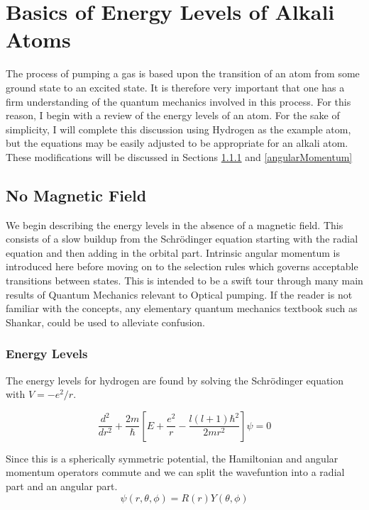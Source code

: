 \documentclass[letter,12pt]{article}
\newcommand{\schr}{Schr\"odinger}
\begin{document}
\section{Basics of Energy Levels of Alkali Atoms}
The process of pumping a gas is based upon the transition
of an atom from some ground state to an excited state. 
It is therefore very important that one has a firm 
understanding of the quantum mechanics involved in this 
process. For this reason, I begin with a review of the energy
levels of an atom. For the sake of simplicity, I will complete
this discussion using
Hydrogen as the example atom, but the equations may be 
easily adjusted to be appropriate for an alkali atom.
These modifications will be discussed in Sections \ref{energyLevels}
and \ref{angularMomentum}
	\subsection{No Magnetic Field}
    We begin describing the energy levels in the absence of 
    a magnetic field. This consists of a slow buildup 
    from the Schr\"odinger equation starting with the radial
    equation and then adding in the orbital part. Intrinsic 
    angular momentum is introduced here before moving on to
    the selection rules which governs acceptable transitions
    between states. This is intended to be a swift tour through
	many main results of Quantum Mechanics relevant to 
	Optical pumping. If the reader is not familiar with the 
	concepts, any elementary quantum mechanics textbook
	such as Shankar, could be used to alleviate confusion.
		\subsubsection{Energy Levels}\label{energyLevels}
		The energy levels for hydrogen are found by solving the
		{\schr} equation with $V=-e^2/r$. 

		\begin{equation}
			{\frac{d^2}{dr^2}+\frac{2m}{\hbar}[E + \frac{e^2}{r} - \frac{l(l+1)\hbar^2}{2mr^2}]}\psi=0
		\end{equation}
		
		Since this is a spherically
		symmetric potential, the Hamiltonian and angular momentum
		operators commute and we can split the wavefuntion into a
		radial part and an angular part. 
		\begin{equation}
			\psi(r,\theta,\phi)=R(r)Y(\theta,\phi)
		\end{equation}
\end{document}
